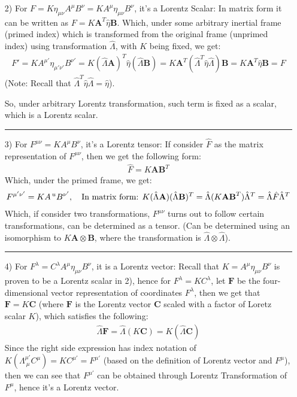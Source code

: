 \documentclass{article}
\newcommand{\bF}{\textbf{F}} %
\newcommand{\bA}{\textbf{A}}
\newcommand{\bB}{\textbf{B}}
\newcommand{\bC}{\textbf{C}}
\begin{document}
\begin{itemize}
    \item[2)] For $F=K \eta_{\mu\nu}A^\mu B^\nu = KA^\mu \eta_{\mu\nu}B^\nu$, it's a Lorentz Scalar: In matrix form it can be written as $F=K\textbf{A}^T\hat{\eta}\textbf{B}$. Which, under some arbitrary inertial frame (primed index) which is transformed from the original frame (unprimed index) using transformation $\hat{\Lambda}$, with $K$ being fixed, we get:
    \begin{align}
        F' = KA^{\mu'}\eta_{\mu'\nu'}B^{\nu'} = K(\hat{\Lambda}\textbf{A})^T\hat{\eta}(\hat{\Lambda}\textbf{B}) = K\textbf{A}^T(\hat{\Lambda}^T\hat{\eta}\hat{\Lambda})\textbf{B} = K\textbf{A}^T\hat{\eta}\textbf{B} = F
    \end{align}
    (Note: Recall that $\hat{\Lambda}^T\hat{\eta}\hat{\Lambda}=\hat{\eta}$).

    So, under arbitrary Lorentz transformation, such term is fixed as a scalar, which is a Lorentz scalar.

    \rule{15.6cm}{0,1mm}

    \item[3)] For $F^{\mu\nu}=KA^\mu B^\nu$, it's a Lorentz tensor: If consider $\hat{F}$ as the matrix representation of $F^{\mu\nu}$, then we get the following form:
    \begin{align}
        \hat{F} = K\bA \bB^T
    \end{align}
    Which, under the primed frame, we get:
    \begin{align}
        F^{\mu'\nu'} = KA^{\,u
        }B^{\nu'},\quad \textmd{In matrix form: } K(\hat{\Lambda}\bA)(\hat{\Lambda}\bB)^T = \hat{\Lambda}(K\bA \bB^T)\hat{\Lambda}^T = \hat{\Lambda}\hat{F}\hat{\Lambda}^T
    \end{align}
    Which, if consider two transformations, $F^{\mu\nu}$ turns out to follow certain transformations, can be determined as a tensor.
    (Can be determined using an isomorphism to $K\bA \otimes \bB$, where the transformation is $\hat{\Lambda}\otimes \hat{\Lambda}$).

    \rule{15.6cm}{0,1mm}

    \item[4)] For $F^\lambda = C^\lambda A^\mu \eta_{\mu\nu}B^\nu$, it is a Lorentz vector: Recall that $K =  A^\mu \eta_{\mu\nu}B^\nu$ is proven to be a Lorentz scalar in 2), hence for $F^\lambda = K C^\lambda$, let $\bF$ be the four-dimensional vector representation of coordinates $F^\lambda$, then we get that $\bF = K\bC$ (where $\bF$ is the Lorentz vector $\bC$ scaled with a factor of Loretz scalar $K$), which satisfies the following:
    \begin{align}
        \hat{\Lambda}\bF = \hat{\Lambda}(K\bC) = K(\hat{\Lambda}\bC)
    \end{align}
    Since the right side expression has index notation of $K(\Lambda^{\mu'}_{\ \mu} C^\mu) = KC^{\mu'} = F^{\mu'}$ (based on the definition of Lorentz vector and $F^\mu$), then we can see that $F^{\mu'}$ can be obtained through Lorentz Transformation of $F^\mu$, hence it's a Lorentz vector.


\end{itemize}
\end{document}
